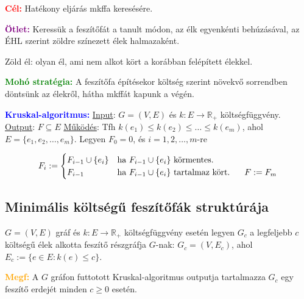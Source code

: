 \documentclass[../szamtud.tex]{subfiles}
\begin{document}
        \textcolor{red}{\textbf{Cél:}} Hatékony eljárás mkffa keresésére.
        
        \textcolor{purple}{\textbf{Ötlet:}} Keressük a feszítőfát a tanult módon, az élk egyenkénti behúzásával, az ÉHL szerint zöldre színezett élek halmazaként. 

        Zöld él: olyan él, ami nem alkot kört a korábban felépített élekkel.

        \textcolor{green}{\textbf{Mohó stratégia:}} A feszítőfa építésekor költség szerint növekvő sorrendben döntsünk az élekről, hátha mkffát kapunk a végén.

        \textcolor{blue}{\textbf{Kruskal-algoritmus:}} \underline{Input}: $G=(V,E)$ és $k:E \rightarrow \mathbb{R}_+$ költségfüggvény. \underline{Output}: $F \subseteq E$ \underline{Működés}: Tfh $k(e_1) \leq k(e_2) \leq \dots \leq k(e_m)$, ahol $E=\{e_1,e_2,\dots, e_m\}$. Legyen $F_0=0$, és $i=1,2,\dots,m$-re

            \begin{equation*}
                F_i :=\begin{cases}
                    F_{i-1}\cup \{e_i\} & \text{ha $F_{i-1}\cup \{e_i\}$ körmentes.} \\
                    F_{i-1} & \text{ha $F_{i-1}\cup \{e_i\}$ tartalmaz kört. \;\;\; $F:=F_m$}
                \end{cases}
            \end{equation*}

    \subsection{Minimális költségű feszítőfák struktúrája}

        $G=(V,E)$ gráf és $k:E \rightarrow \mathbb{R}_+$ költségfüggvény esetén legyen $G_c$ a legfeljebb $c$ költségű élek alkotta feszítő részgráfja $G$-nak: $G_c = (V,E_c)$, ahol $E_c := \{e \in E : k(e)\leq c\}$.

        \textcolor{orange}{\textbf{Megf:}} A $G$ gráfon futtotott Kruskal-algoritmus outputja tartalmazza $G_c$ egy feszítő erdejét minden $c \geq 0$ esetén.

\end{document}
